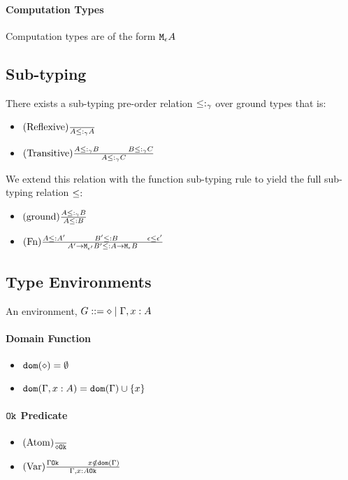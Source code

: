 {        \paragraph{Computation Types}
        Computation types are of the form $\texttt{M}_{\epsilon}{A}$

    \subsection{Sub-typing}
        There exists a sub-typing pre-order relation $\leq:_{\gamma}$ over ground types that is:
        \begin{itemize}
            \item $(\text{Reflexive}) \frac{}{A \leq:_{\gamma} A}$
            \item $\treerule{Transitive}{A \subtype_{\ground} B \s \s B \subtype_{\ground} C}{A \subtype_{\ground} C}$
        \end{itemize}

        We extend this relation with the function sub-typing rule to yield the full sub-typing relation $\leq:$

        \begin{itemize}
            \item $(\text{ground}) \frac{A \leq:_{\gamma} B}{A \leq: B}$
            \item $\treerule{Fn}{A \subtype A' \s\s B' \subtype B \s \s \e \subeffect \e'}{\lamtype{A'}{\e'}{B'} \subtype \aeb}$
        \end{itemize}
    \subsection{Type Environments}
    An environment, $G ::= \diamond \mid \Gamma, x: A$ 
    \paragraph{Domain Function}
    \begin{itemize}
        \item $\texttt{dom}(\diamond) = \emptyset$
        \item $\texttt{dom}(\Gamma, x: A) =  \texttt{dom}(\Gamma)  \cup \left\{x \right\}$
    \end{itemize}
    \paragraph{$\texttt{Ok}$ Predicate}
    \begin{itemize}
        \item $(\text{Atom}) \frac{}{\diamond \texttt{Ok}}$
        \item $\treerule{Var}{\ok{\G} \s\s x\notin \dom{\G}}{\ok{\gax}}$
    \end{itemize}



}
